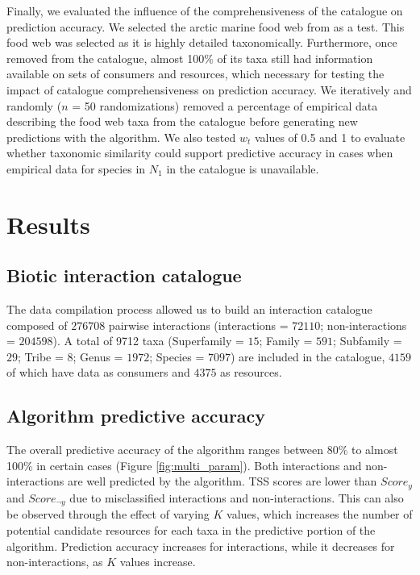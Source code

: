 Finally, we evaluated the influence of the comprehensiveness of the catalogue on prediction accuracy. We selected the arctic marine food web from \citet{kortsch2015} as a test. This food web was selected as it is highly detailed taxonomically. Furthermore, once removed from the catalogue, almost 100\% of its taxa still had information available on sets of consumers and resources, which necessary for testing the impact of catalogue comprehensiveness on prediction accuracy. We iteratively and randomly ($n$ = 50 randomizations) removed a percentage of empirical data describing the food web taxa from the catalogue before generating new predictions with the algorithm. We also tested $w_t$ values of 0.5 and 1 to evaluate whether taxonomic similarity could support predictive accuracy in cases when empirical data for species in $N_1$ in the catalogue is unavailable.

\section{Results}
    \subsection{Biotic interaction catalogue}
The data compilation process allowed us to build an interaction catalogue composed of $276708$ pairwise interactions (interactions = $72110$; non-interactions = $204598$). A total of 9712 taxa (Superfamily = $15$; Family = $591$; Subfamily = $29$; Tribe = $8$; Genus = $1972$; Species = $7097$) are included in the catalogue, $4159$ of which have data as consumers and $4375$ as resources.

    \subsection{Algorithm predictive accuracy}
The overall predictive accuracy of the algorithm ranges between 80\% to almost 100\% in certain cases (Figure \ref{fig:multi_param}). Both interactions and non-interactions are well predicted by the algorithm. TSS scores are lower than $Score_y$ and $Score_{\neg y}$ due to misclassified interactions and non-interactions. This can also be observed through the effect of varying $K$ values, which increases the number of potential candidate resources for each taxa in the predictive portion of the algorithm. Prediction accuracy increases for interactions, while it decreases for non-interactions, as $K$ values increase.

